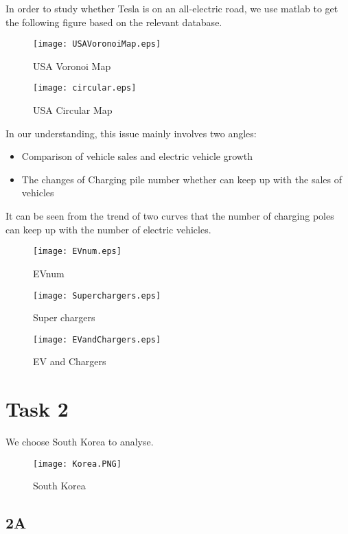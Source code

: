 \documentclass{mcmthesis}
\begin{document}
In order to study whether Tesla is on an all-electric road, we use matlab to get the following figure based on the relevant database.

\begin{figure}[H]
\small
\centering
\texttt{[image: USAVoronoiMap.eps]}
\caption{USA Voronoi Map} 
\end{figure}

\begin{figure}[htbp]
\small
\centering
\texttt{[image: circular.eps]}
\caption{USA Circular Map} 
\end{figure}


In our understanding, this issue mainly involves two angles:

\begin{itemize}
\item Comparison of vehicle sales and electric vehicle growth
\item The changes of Charging pile number whether can keep up with the sales of vehicles
\end{itemize}


It can be seen from the trend of two curves that the number of charging poles can keep up with the number of electric vehicles.


\begin{figure}[htbp]
\small
\centering
\texttt{[image: EVnum.eps]}
\caption{EVnum} 
\end{figure}

\begin{figure}[htbp]
\small
\centering
\texttt{[image: Superchargers.eps]}
\caption{Super chargers} 
\end{figure}


\begin{figure}[H]
\small
\centering
\texttt{[image: EVandChargers.eps]}
\caption{EV and Chargers} 
\end{figure}

\section{Task 2}
We choose South Korea to analyse.
\begin{figure}[H]
\small
\centering
\texttt{[image: Korea.PNG]}
\caption{South Korea} 
\end{figure}

\subsection{2A}
\end{document}
